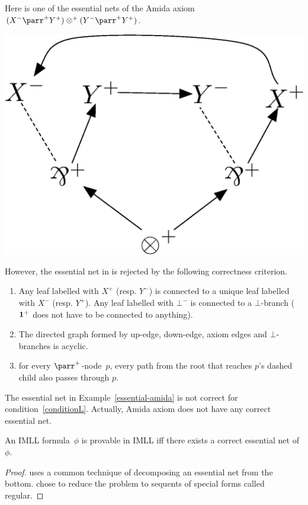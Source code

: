  \begin{example} \label{essential-amida}
  Here is one of the essential nets of
  the Amida axiom $(X^-\parr^+Y^+)\otimes^+(Y^-\parr^+ Y^+)$.
   \begin{center}
    \includegraphics[scale=0.4]{amida-essential.eps}
   \end{center}
 \end{example}
 However, the essential net in  is rejected by
 the following correctness criterion.
  \begin{definition}
\begin{enumerate}
 \item Any leaf labelled with $X^+$ (resp. $Y^-$) is connected to a
       unique leaf labelled with $X^-$ (resp. $Y^+$).
       Any leaf labelled with $\bot^-$ is connected to a $\bot$-branch
       ($\mathbf{1}^+$ does not have to be connected to anything).
 \item The directed graph formed by up-edge, down-edge, axiom edges and
       $\bot$-branches is acyclic.
 \item \label{conditionL}
       for every $\parr^+$-node~$p$, every path from the root that reaches
       $p$'s dashed child also passes through $p$.
\end{enumerate}
  \end{definition}
The essential net in Example~\ref{essential-amida} is not correct for
condition~\ref{conditionL}.  Actually, Amida axiom does not have
any correct essential net.

 \begin{theorem}
  \label{essential-ok}
  An IMLL formula~$\phi$ is provable in IMLL iff there exists a correct essential net
  of $\phi$.
 \end{theorem}
 \begin{proof}
  \citet{lamarche2008} uses a common technique of decomposing an
  essential net from the bottom.
  \citet{murawski2003} chose to reduce the problem to sequents of special forms
  called regular.
 \end{proof}

